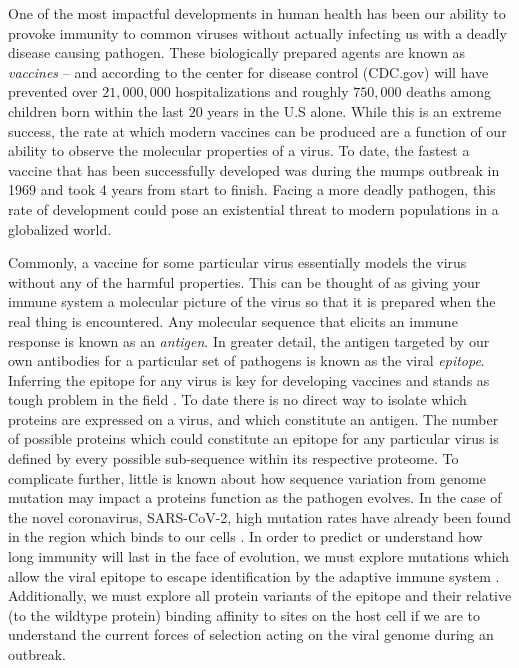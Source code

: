\documentclass{article}
\begin{document}
One of the most impactful developments in human health has been our ability to provoke immunity to common viruses without actually infecting us with a deadly disease causing pathogen.
These biologically prepared agents are known as \textit{vaccines} --
and according to the center for disease control (CDC.gov) will have prevented over $21,000,000$ hospitalizations and roughly $750,000$
deaths among children born within the last $20$ years in the U.S alone.
While this is an extreme success, the rate at which modern vaccines can be produced are a function of our ability to observe the molecular properties of a virus.
To date, the fastest a vaccine that has been successfully developed was during the mumps outbreak in 1969 and took 4 years from start to finish.
Facing a more deadly pathogen, this rate of development could pose an existential threat to modern populations in a globalized world.


Commonly, a vaccine for some particular virus essentially models the virus without any of the harmful properties.
This can be thought of as giving your immune system a molecular picture of the virus so that it is prepared when the real thing is encountered.
Any molecular sequence that elicits an immune response is known as an \textit{antigen}.
In greater detail, the antigen targeted by our own antibodies for a particular set of pathogens is known as the viral \textit{epitope}.
Inferring the epitope for any virus is key for developing vaccines and stands as tough problem in the field \citep{Stoddard2020}.
To date there is no direct way to isolate which proteins are expressed on a virus, and which constitute an antigen.
The number of possible proteins which could constitute an epitope for any particular virus is defined by every possible sub-sequence within its respective proteome.
To complicate further, little is known about how sequence variation from genome mutation may impact a proteins function as the pathogen evolves.
In the case of the novel coronavirus, SARS-CoV-2, high mutation rates have already been found in the region which binds to our cells \citep{Garrett2020, Starr2020}.
In order to predict or understand how long immunity will last in the face of evolution, we must explore mutations which allow the viral epitope to escape identification by the adaptive immune system \citep{Garrett2020}.
Additionally, we must explore all protein variants of the epitope and their relative (to the wildtype protein) binding affinity to sites on the host cell if we are to understand the current forces of selection acting on the viral genome during an outbreak.
\end{document}

